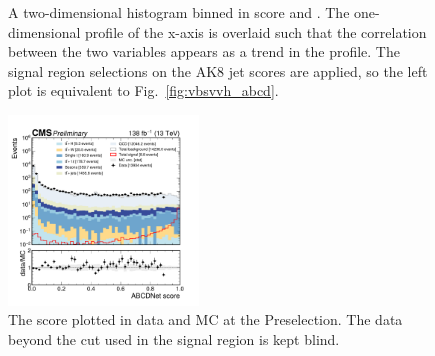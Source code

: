 \begin{figure}[htb]
    \centering
    \qquad
    \caption[A two-dimensional histogram binned in \ABCDNet score and \detajj]{
        A two-dimensional histogram binned in \ABCDNet score and \detajj. 
        The one-dimensional profile of the x-axis is overlaid such that the correlation between the two variables appears as a trend in the profile. 
        The signal region selections on the AK8 jet \ParticleNet scores are applied, so the left plot is equivalent to Fig.~\ref{fig:vbsvvh_abcd}.
    }
    \label{fig:vbsvvh_abcdnet_decorr}
\end{figure}

\begin{figure}[htb]
    \centering
    \includegraphics[width=0.45\textwidth]{fig/vbsvvh/abcdnet_score_data_vs_mc_log_presel.pdf}
    \caption[The \ABCDNet score plotted in data and MC at the Preselection]{
        The \ABCDNet score plotted in data and MC at the Preselection. 
        The data beyond the cut used in the signal region is kept blind. 
    }
    \label{fig:vbsvvh_abcdnet_score}
\end{figure}


